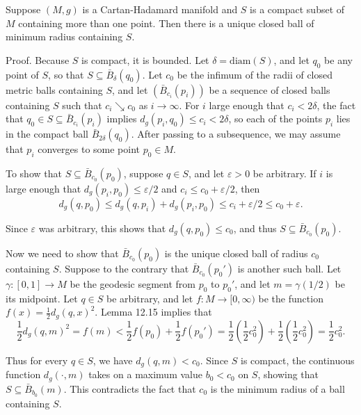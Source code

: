\begin{lemma}\label{lem:unique-minimal-enclosing-ball}
Suppose $(M, g)$ is a Cartan-Hadamard manifold and $S$ is a compact subset of $M$ containing more than one point. Then there is a unique closed ball of minimum radius containing $S$.

Proof. Because $S$ is compact, it is bounded. Let $\delta = \text{diam}(S)$, and let $q_0$ be any point of $S$, so that $S \subseteq \bar{B}_\delta(q_0)$. Let $c_0$ be the infimum of the radii of closed metric balls containing $S$, and let $(\bar{B}_{c_i}(p_i))$ be a sequence of closed balls containing $S$ such that $c_i \searrow c_0$ as $i \to \infty$. For $i$ large enough that $c_i < 2\delta$, the fact that $q_0 \in S \subseteq \bar{B}_{c_i}(p_i)$ implies $d_g(p_i, q_0) \leq c_i < 2\delta$, so each of the points $p_i$ lies in the compact ball $\bar{B}_{2\delta}(q_0)$. After passing to a subsequence, we may assume that $p_i$ converges to some point $p_0 \in M$.

To show that $S \subseteq \bar{B}_{c_0}(p_0)$, suppose $q \in S$, and let $\varepsilon > 0$ be arbitrary. If $i$ is large enough that $d_g(p_i, p_0) \leq \varepsilon/2$ and $c_i \leq c_0 + \varepsilon/2$, then
\[
d_g(q, p_0) \leq d_g(q, p_i) + d_g(p_i, p_0) \leq c_i + \varepsilon/2 \leq c_0 + \varepsilon.
\]

Since $\varepsilon$ was arbitrary, this shows that $d_g(q, p_0) \leq c_0$, and thus $S \subseteq \bar{B}_{c_0}(p_0)$.

Now we need to show that $\bar{B}_{c_0}(p_0)$ is the unique closed ball of radius $c_0$ containing $S$. Suppose to the contrary that $\bar{B}_{c_0}(p_0')$ is another such ball. Let $\gamma : [0, 1] \to M$ be the geodesic segment from $p_0$ to $p_0'$, and let $m = \gamma(1/2)$ be its midpoint. Let $q \in S$ be arbitrary, and let $f : M \to [0, \infty)$ be the function $f(x) = \frac{1}{2}d_g(q, x)^2$. Lemma 12.15 implies that
\[
\frac{1}{2}d_g(q, m)^2 = f(m) < \frac{1}{2}f(p_0) + \frac{1}{2}f(p_0') = \frac{1}{2}(\frac{1}{2}c_0^2) + \frac{1}{2}(\frac{1}{2}c_0^2) = \frac{1}{2}c_0^2.
\]

Thus for every $q \in S$, we have $d_g(q, m) < c_0$. Since $S$ is compact, the continuous function $d_g(\cdot, m)$ takes on a maximum value $b_0 < c_0$ on $S$, showing that $S \subseteq \bar{B}_{b_0}(m)$. This contradicts the fact that $c_0$ is the minimum radius of a ball containing $S$.
\end{lemma}

